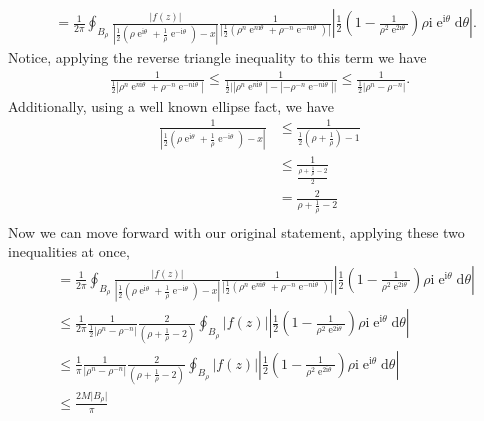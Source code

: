 \documentclass[10pt]{amsart}
\newcommand{\D}{\mathrm{d}}
\newcommand{\I}{\mathrm{i}}
\DeclareMathOperator{\E}{e}
\theoremstyle{nonumberplain}
\begin{document}
\begin{enumerate}[label={\bf {\arabic*}:}]
\begin{enumerate}
\begin{align*}
&= \frac 1 {2 \pi}
	\oint_{B_\rho}
		\frac{ |f(z)|}{|\frac 1 2 (\rho \E^{\I \theta} + \frac 1 \rho \E^{- \I \theta}) - x|}
		\frac 1  {\left| \frac 1 2 \left( \rho^n \E^{n \I \theta} + \rho^{-n} \E^{-n\I \theta} \right) \right|}
		\left|\frac 1 2 \left(1 - \frac 1 {\rho^2 \E^{2 \I \theta}} \right) \rho \I \E^{\I \theta} \D \theta \right|.
\end{align*}
Notice, applying the reverse triangle inequality to this term we have
\begin{align*}
\frac 1  {\frac 1 2 \left| \rho^n \E^{n \I \theta} + \rho^{-n} \E^{-n\I \theta} \right|}
	\leq \frac 1  {\frac 1 2 \Big| \left| \rho^n \E^{n \I \theta} \right| - \left| - \rho^{-n} \E^{-n\I \theta} \right| \Big|} 
	\leq \frac 1  {\frac 1 2 \left| \rho^n - \rho^{-n} \right|}.
\end{align*}
Additionally, using a well known ellipse fact, we have
\begin{align*}
\frac 1 {|\frac 1 2 (\rho \E^{\I \theta} + \frac 1 \rho \E^{- \I \theta}) - x|}
	&\leq \frac 1 {\frac 1 2 \left( \rho + \frac 1 \rho \right)- 1} \\
	&\leq \frac 1 { \frac { \rho + \frac 1 \rho - 2}{2}} \\
	&= \frac 2 { \rho + \frac 1 \rho - 2} \\
\end{align*}
Now we can move forward with our original statement, applying these two inequalities at once,
\begin{align*}
&= \frac 1 {2 \pi}
	\oint_{B_\rho}
		\frac{ |f(z)|}{|\frac 1 2 (\rho \E^{\I \theta} + \frac 1 \rho \E^{- \I \theta}) - x|}
		\frac 1  {\left| \frac 1 2 \left( \rho^n \E^{n \I \theta} + \rho^{-n} \E^{-n\I \theta} \right) \right|}
		\left|\frac 1 2 \left(1 - \frac 1 {\rho^2 \E^{2 \I \theta}} \right) \rho \I \E^{\I \theta} \D \theta \right| \\
&\leq \frac 1 {2 \pi}
	\frac 1  {\frac 1 2 \left| \rho^n - \rho^{-n} \right|}
	\frac 2 { \left( \rho + \frac 1 \rho - 2 \right)}
	\oint_{B_\rho} |f(z)| \left|\frac 1 2 \left(1 - \frac 1 {\rho^2 \E^{2 \I \theta}} \right) \rho \I \E^{\I \theta} \D \theta \right| \\
&\leq \frac 1 {\pi}
	\frac 1  {\left| \rho^n - \rho^{-n} \right|}
	\frac 2 { \left( \rho + \frac 1 \rho - 2 \right)}
	\oint_{B_\rho} |f(z)| \left|\frac 1 2 \left(1 - \frac 1 {\rho^2 \E^{2 \I \theta}} \right) \rho \I \E^{\I \theta} \D \theta \right| \\
&\leq \frac {2 M \big| B_\rho \big|} {\pi}

\end{align*}
\end{enumerate}
\end{enumerate}
\end{document}
